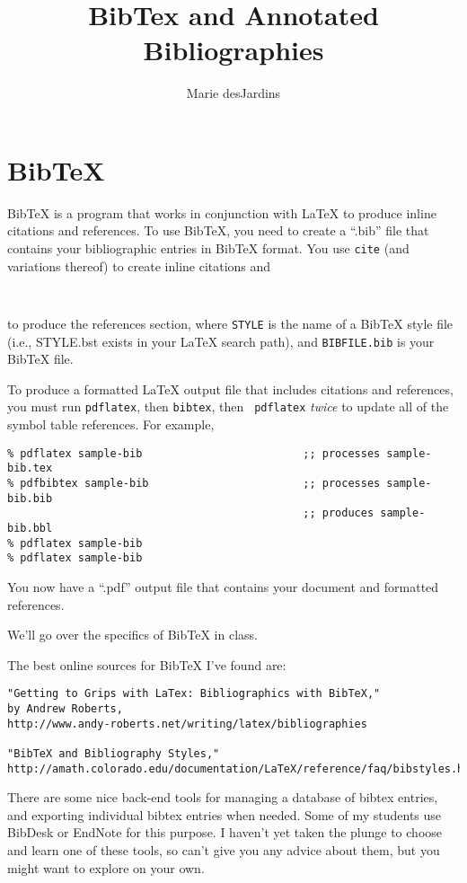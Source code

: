 \documentclass{article}
\title{BibTex and Annotated Bibliographies}
\author{Marie desJardins}
\begin{document}
\maketitle

\section{BibTeX}

BibTeX is a program that works in conjunction with LaTeX to produce
inline citations and references.  To use BibTeX, you need to
create a ``.bib'' file that contains your bibliographic entries in 
BibTeX format.  You use {\tt cite} (and variations thereof) to create
inline citations and
\begin{verbatim}


\end{verbatim}
to produce the references section, where {\tt STYLE} is the name of a BibTeX
style file (i.e., STYLE.bst exists in your LaTeX search path), and
{\tt BIBFILE.bib} is your BibTeX file.

To produce a formatted LaTeX output file that includes citations and
references, you must run {\tt pdflatex}, then {\tt bibtex}, then {\tt
  pdflatex} {\em twice} to update all of the symbol table references.
For example,
\begin{verbatim}
% pdflatex sample-bib                         ;; processes sample-bib.tex
% pdfbibtex sample-bib                        ;; processes sample-bib.bib
                                              ;; produces sample-bib.bbl
% pdflatex sample-bib
% pdflatex sample-bib
\end{verbatim}
You now have a ``.pdf'' output file that contains your
document and formatted references.

We'll go over the specifics of BibTeX in class.

The best online sources for BibTeX I've found are:
\begin{verbatim}
"Getting to Grips with LaTex: Bibliographics with BibTeX,"
by Andrew Roberts,
http://www.andy-roberts.net/writing/latex/bibliographies

"BibTeX and Bibliography Styles,"
http://amath.colorado.edu/documentation/LaTeX/reference/faq/bibstyles.html
\end{verbatim}

There are some nice back-end tools for managing a database
of bibtex entries, and exporting individual bibtex entries
when needed.  Some of my students use BibDesk or EndNote
for this purpose.  I haven't yet taken the plunge to choose
and learn one of these tools, so can't give you any advice
about them, but you might want to explore on your own.
\end{document}
